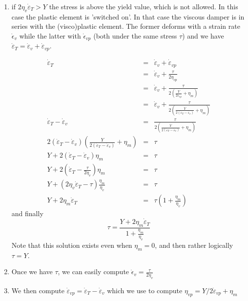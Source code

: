 \begin{itemize}
\begin{enumerate}
\item if $2 \eta_v \dot\varepsilon_T > Y$ the stress is above the yield value, which is not allowed. In this case the plastic element is 'switched on'. In that case the viscous damper is in series with the (visco)plastic element. The former deforms with a strain rate $\dot\epsilon_v$ while the latter with $\dot\epsilon_{vp}$ (both under the same stress $\tau$) and we have  $\dot\varepsilon_T = \dot\varepsilon_v  + \dot\varepsilon_{vp}$. 

\begin{eqnarray}
\dot\varepsilon_T 
&=& \dot\varepsilon_v + \dot\varepsilon_{vp}  \nonumber\\
&=& \dot\varepsilon_v + \frac{\tau}{2 \eta_{vp}} \nonumber\\
&=& \dot\varepsilon_v + \frac{\tau}{2 \left( \frac{Y}{2\dot\varepsilon_{vp}} + \eta_m  \right)} \nonumber\\
&=& \dot\varepsilon_v + \frac{\tau}{2 \left( \frac{Y}{2(\dot\varepsilon_T-\dot\varepsilon_v)}+\eta_m\right)} \nonumber\\
\dot\varepsilon_T - \dot\varepsilon_v 
&=& \frac{\tau}{2 \left( \frac{Y}{2(\dot\varepsilon_T-\dot\varepsilon_v)}+\eta_m\right)} \nonumber\\
2 (\dot\varepsilon_T - \dot\varepsilon_v)
\left( \frac{Y}{2(\dot\varepsilon_T-\dot\varepsilon_v)}+\eta_m\right) &=& \tau \nonumber\\
Y +  2(\dot\varepsilon_T - \dot\varepsilon_v) \eta_m &=& \tau \nonumber\\
Y +  2(\dot\varepsilon_T - \frac{\tau}{2 \eta_v}) \eta_m &=& \tau \nonumber\\
Y +  (2\eta_v \dot\varepsilon_T - \tau) \frac{\eta_m}{\eta_v} &=& \tau \nonumber\\
Y +  2\eta_m \dot\varepsilon_T  &=& \tau (1 + \frac{\eta_m}{\eta_v} ) \nonumber
\end{eqnarray}
and finally 
\begin{equation}
\tau  = \frac{Y + 2 \eta_m \dot\varepsilon_T} {1+ \frac{\eta_m}{\eta_v} }
\end{equation}
Note that this solution exists even when $\eta_m=0$, and then rather logically $\tau=Y$.

\item Once we have $\tau$, we can easily compute $\dot\epsilon_v = \frac{\tau}{2\eta_v}$

\item We then compute $\dot\varepsilon_{vp} = \dot\varepsilon_T- \dot\varepsilon_v$ which 
we use to compute $\eta_{vp} = Y/2\dot\varepsilon_{vp}+\eta_m$


\end{enumerate}
\end{itemize}
